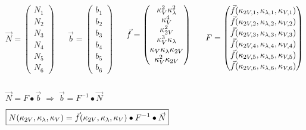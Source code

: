 {    \begin{columns}[T]
        \begin{column}{0.18\textwidth}
            $ \vec{N} = \begin{pmatrix} N_1 \\ N_2 \\ N_3 \\ N_4 \\ N_5 \\ N_6 \end{pmatrix} $
        \end{column}
        \begin{column}{0.15\textwidth}
            $ \vec{b} = \begin{pmatrix} b_1 \\ b_2 \\ b_3 \\ b_4 \\ b_5 \\ b_6 \end{pmatrix} $
        \end{column}
        \begin{column}{0.25\textwidth}
            $ \vec{f} = \begin{pmatrix} \kappa_{V}^2 \kappa_{\lambda}^2 \\ \kappa_{V}^4 \\ \kappa_{2V}^2 \\ \kappa_{V}^3 \kappa_{\lambda} \\ \kappa_{V} \kappa_{\lambda} \kappa_{2V} \\ \kappa_{V}^2 \kappa_{2V} \end{pmatrix} $
        \end{column}
        \begin{column}{0.4\textwidth}
            $ F = \begin{pmatrix}
                \vec{f}(\kappa_{2V,1}, \kappa_{\lambda,1}, \kappa_{V,1}) \\
                \vec{f}(\kappa_{2V,2}, \kappa_{\lambda,2}, \kappa_{V,2}) \\
                \vec{f}(\kappa_{2V,3}, \kappa_{\lambda,3}, \kappa_{V,3}) \\
                \vec{f}(\kappa_{2V,4}, \kappa_{\lambda,4}, \kappa_{V,4}) \\
                \vec{f}(\kappa_{2V,5}, \kappa_{\lambda,5}, \kappa_{V,5}) \\
                \vec{f}(\kappa_{2V,6}, \kappa_{\lambda,6}, \kappa_{V,6}) \\
            \end{pmatrix} $
        \end{column}
    \end{columns}

    \vspace{10mm}

    $ \vec{N} = F \bullet \vec{b} \; \Longrightarrow \; \vec{b} = F^{-1} \bullet \vec{N} $

    \vspace{10mm}

    $ \boxed{ N(\kappa_{2V},\kappa_{\lambda},\kappa_{V}) = \vec{f}(\kappa_{2V},\kappa_{\lambda},\kappa_{V}) \bullet F^{-1} \bullet \vec{N} } $
}


